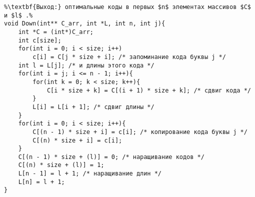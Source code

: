 \begin{lstlisting}[escapechar=\%]
%\noindent\textbf{Вход:} $n$ - длина обрабатываемой части массива $P$, $j$ - номер "разделяемой" буквы.\\%
%\textbf{Выход:} оптимальные коды в первых $n$ элементах массивов $C$ и $l$ .%
void Down(int** C_arr, int *L, int n, int j){
	int *C = (int*)C_arr;
	int c[size];
	for(int i = 0; i < size; i++)
		c[i] = C[j * size + i]; /* запоминание кода буквы j */
	int l = L[j]; /* и длины этого кода */
	for(int i = j; i <= n - 1; i++){
		for(int k = 0; k < size; k++){
			C[i * size + k] = C[(i + 1) * size + k]; /* сдвиг кода */
		}
		L[i] = L[i + 1]; /* сдвиг длины */
	}
	for(int i = 0; i < size; i++){
		C[(n - 1) * size + i] = c[i]; /* копирование кода буквы j */
		C[(n) * size + i] = c[i];
	}
	C[(n - 1) * size + (l)] = 0; /* наращивание кодов */
	C[(n) * size + (l)] = 1;
	L[n - 1] = l + 1; /* наращивание длин */
	L[n] = l + 1;
}
\end{lstlisting}
